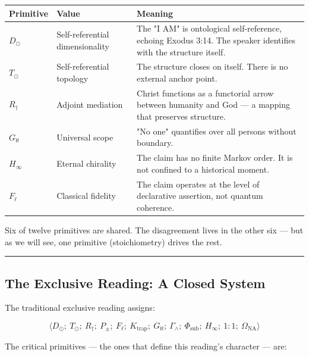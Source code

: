 \documentclass[12pt,a4paper]{article}
\begin{document}
\begin{table}[htbp]
\centering
\small
{}
\begin{tabularx}{\textwidth}{>{\centering\arraybackslash}X >{\centering\arraybackslash}X >{\centering\arraybackslash}X}
\toprule
\rowcolor{gray!25}\textbf{Primitive} & \textbf{Value} & \textbf{Meaning} \\
\midrule
\rowcolors{1}{white}{gray!10}
$D_{\odot}$ & Self-referential dimensionality & The "I AM" is ontological self-reference, echoing Exodus 3:14. The speaker identifies with the structure itself. \\
$T_{\odot}$ & Self-referential topology & The structure closes on itself. There is no external anchor point. \\
$R_{\dagger}$ & Adjoint mediation & Christ functions as a functorial arrow between humanity and God --- a mapping that preserves structure. \\
$G_{\aleph}$ & Universal scope & "No one" quantifies over all persons without boundary. \\
$H_{\infty}$ & Eternal chirality & The claim has no finite Markov order. It is not confined to a historical moment. \\
$F_{\ell}$ & Classical fidelity & The claim operates at the level of declarative assertion, not quantum coherence. \\
\bottomrule
\end{tabularx}
\end{table}

Six of twelve primitives are shared. The disagreement lives in the other six --- but as we will see, one primitive (stoichiometry) drives the rest.

\begin{center}
\rule{0.5\textwidth}{0.4pt}
\end{center}

\subsection{The Exclusive Reading: A Closed System}

The traditional exclusive reading assigns:

\[\langle D_{\odot};\ T_{\odot};\ R_{\dagger};\ P_{\pm};\ F_{\ell};\ K_\text{trap};\ G_{\aleph};\ \Gamma_{\wedge};\ \Phi_\text{sub};\ H_{\infty};\ 1{:}1;\ \Omega_\text{NA} \rangle\]

The critical primitives --- the ones that define this reading's character --- are:
\end{document}
